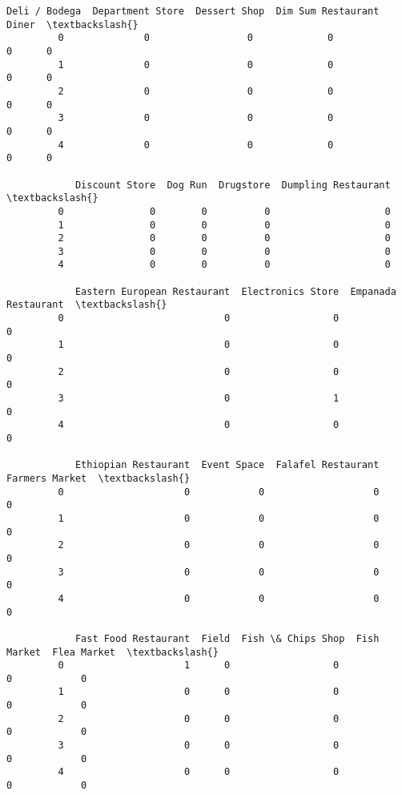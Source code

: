 \documentclass[11pt]{article}
\begin{document}
\begin{Verbatim}[commandchars=\\\{\}]
            Deli / Bodega  Department Store  Dessert Shop  Dim Sum Restaurant  Diner  \textbackslash{}
         0              0                 0             0                   0      0   
         1              0                 0             0                   0      0   
         2              0                 0             0                   0      0   
         3              0                 0             0                   0      0   
         4              0                 0             0                   0      0   
         
            Discount Store  Dog Run  Drugstore  Dumpling Restaurant  \textbackslash{}
         0               0        0          0                    0   
         1               0        0          0                    0   
         2               0        0          0                    0   
         3               0        0          0                    0   
         4               0        0          0                    0   
         
            Eastern European Restaurant  Electronics Store  Empanada Restaurant  \textbackslash{}
         0                            0                  0                    0   
         1                            0                  0                    0   
         2                            0                  0                    0   
         3                            0                  1                    0   
         4                            0                  0                    0   
         
            Ethiopian Restaurant  Event Space  Falafel Restaurant  Farmers Market  \textbackslash{}
         0                     0            0                   0               0   
         1                     0            0                   0               0   
         2                     0            0                   0               0   
         3                     0            0                   0               0   
         4                     0            0                   0               0   
         
            Fast Food Restaurant  Field  Fish \& Chips Shop  Fish Market  Flea Market  \textbackslash{}
         0                     1      0                  0            0            0   
         1                     0      0                  0            0            0   
         2                     0      0                  0            0            0   
         3                     0      0                  0            0            0   
         4                     0      0                  0            0            0   
         

\end{Verbatim}
\end{document}

